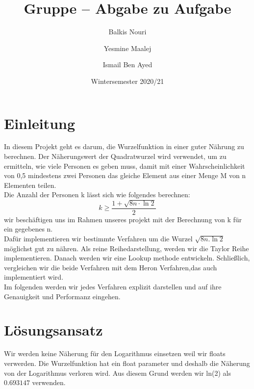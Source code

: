\documentclass[course=erap]{aspdoc}
\author{Balkis Nouri \and Yesmine Maalej \and Ismail Ben Ayed}
\date{Wintersemester 2020/21} %
\title{Gruppe \theGroup{} -- Abgabe zu Aufgabe \theNumber}
\begin{document}
\maketitle

\section{Einleitung}
In diesem Projekt geht es darum, die Wurzelfunktion in einer guter Nährung zu berechnen.
Der Näherungswert der Quadratwurzel wird verwendet, um zu ermitteln, wie viele
Personen es geben muss, damit mit einer Wahrscheinlichkeit von 0,5 mindestens zwei Personen
das gleiche Element aus einer Menge M von n Elementen teilen.
\\ Die Anzahl der Personen k lässt sich wie folgendes berechnen:
\begin{equation} \label{eq1}
    k \geq \frac{1+\sqrt{8n \cdot \ln{2}}}{2}
\end{equation}
wir beschäftigen uns im Rahmen unseres projekt mit der Berechnung von k für ein gegebenes n.
\\ Dafür implementieren wir bestimmte Verfahren um  die Wurzel $\sqrt{8n. \ln{2}}$ möglichst gut zu nähren.
Als reine Reihedarstellung, werden wir die Taylor Reihe implementieren. Danach werden wir eine Lookup methode entwickeln.
Schließlich, vergleichen wir die beide Verfahren mit dem Heron Verfahren,das auch implementiert wird.  \\
Im folgenden werden wir jedes Verfahren explizit darstellen und auf ihre Genauigkeit und  Performanz eingehen.
\section{Lösungsansatz}
Wir werden keine Näherung für den Logarithmus einsetzen weil wir floats verwerden. Die Wurzelfunktion hat ein float parameter
und deshalb die Näherung von der Logarithmus verloren wird. Aus diesem Grund werden wir ln(2) als $0.693147$ verwenden.
\end{document}
